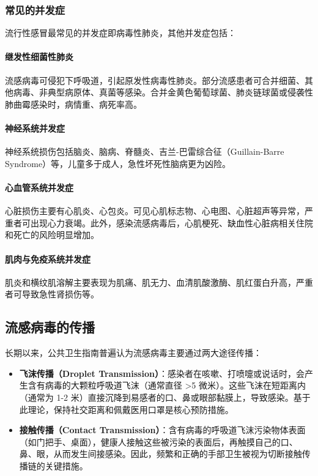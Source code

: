 \documentclass[9pt,a4paper,twoside]{rho-class/rho}
\begin{document}
    \subsubsection{常见的并发症}

    流行性感冒最常见的并发症即病毒性肺炎，其他并发症包括：

    \paragraph{继发性细菌性肺炎}
    流感病毒可侵犯下呼吸道，引起原发性病毒性肺炎。部分流感患者可合并细菌、其他病毒、非典型病原体、真菌等感染。合并金黄色葡萄球菌、肺炎链球菌或侵袭性肺曲霉感染时，病情重、病死率高。

    \paragraph{神经系统并发症}
    神经系统损伤包括脑炎、脑病、脊髓炎、吉兰-巴雷综合征（Guillain-Barre Syndrome）等，儿童多于成人，急性坏死性脑病更为凶险。

    \paragraph{心血管系统并发症}
    心脏损伤主要有心肌炎、心包炎。可见心肌标志物、心电图、心脏超声等异常，严重者可出现心力衰竭。此外，感染流感病毒后，心肌梗死、缺血性心脏病相关住院和死亡的风险明显增加。

    \paragraph{肌肉与免疫系统并发症}
    肌炎和横纹肌溶解主要表现为肌痛、肌无力、血清肌酸激酶、肌红蛋白升高，严重者可导致急性肾损伤等。

    \subsection{流感病毒的传播}

    长期以来，公共卫生指南普遍认为流感病毒主要通过两大途径传播：
    \begin{itemize}
    \item \textbf{飞沫传播（Droplet Transmission）}：感染者在咳嗽、打喷嚏或说话时，会产生含有病毒的大颗粒呼吸道飞沫（通常直径 >5 微米）。这些飞沫在短距离内（通常为 1-2 米）直接沉降到易感者的口、鼻或眼部黏膜上，导致感染。基于此理论，保持社交距离和佩戴医用口罩是核心预防措施。
    \item \textbf{接触传播（Contact Transmission）}：含有病毒的呼吸道飞沫污染物体表面（如门把手、桌面），健康人接触这些被污染的表面后，再触摸自己的口、鼻、眼，从而发生间接感染。因此，频繁和正确的手部卫生被视为切断接触传播链的关键措施。
    \end{itemize}
\end{document}
